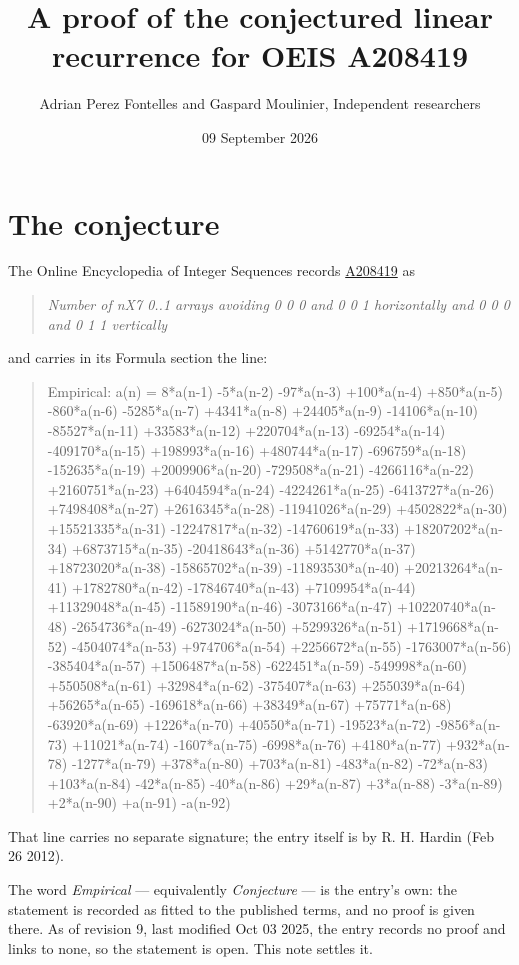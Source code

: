\documentclass[11pt]{article}
\title{A proof of the conjectured linear recurrence for OEIS A208419}
\author{Adrian Perez Fontelles and Gaspard Moulinier, Independent researchers}
\date{09 September 2026}
\theoremstyle{definition}
\begin{document}
\maketitle
\section{The conjecture}

The Online Encyclopedia of Integer Sequences records \href{https://oeis.org/A208419}{A208419} as

\begin{quote}\itshape Number of nX7 0..1 arrays avoiding 0 0 0 and 0 0 1 horizontally and 0 0 0 and 0 1 1 vertically\end{quote}

and carries in its Formula section the line:

\begin{quote}\ttfamily Empirical: a(n) = 8*a(n-1) -5*a(n-2) -97*a(n-3) +100*a(n-4) +850*a(n-5) -860*a(n-6) -5285*a(n-7) +4341*a(n-8) +24405*a(n-9) -14106*a(n-10) -85527*a(n-11) +33583*a(n-12) +220704*a(n-13) -69254*a(n-14) -409170*a(n-15) +198993*a(n-16) +480744*a(n-17) -696759*a(n-18) -152635*a(n-19) +2009906*a(n-20) -729508*a(n-21) -4266116*a(n-22) +2160751*a(n-23) +6404594*a(n-24) -4224261*a(n-25) -6413727*a(n-26) +7498408*a(n-27) +2616345*a(n-28) -11941026*a(n-29) +4502822*a(n-30) +15521335*a(n-31) -12247817*a(n-32) -14760619*a(n-33) +18207202*a(n-34) +6873715*a(n-35) -20418643*a(n-36) +5142770*a(n-37) +18723020*a(n-38) -15865702*a(n-39) -11893530*a(n-40) +20213264*a(n-41) +1782780*a(n-42) -17846740*a(n-43) +7109954*a(n-44) +11329048*a(n-45) -11589190*a(n-46) -3073166*a(n-47) +10220740*a(n-48) -2654736*a(n-49) -6273024*a(n-50) +5299326*a(n-51) +1719668*a(n-52) -4504074*a(n-53) +974706*a(n-54) +2256672*a(n-55) -1763007*a(n-56) -385404*a(n-57) +1506487*a(n-58) -622451*a(n-59) -549998*a(n-60) +550508*a(n-61) +32984*a(n-62) -375407*a(n-63) +255039*a(n-64) +56265*a(n-65) -169618*a(n-66) +38349*a(n-67) +75771*a(n-68) -63920*a(n-69) +1226*a(n-70) +40550*a(n-71) -19523*a(n-72) -9856*a(n-73) +11021*a(n-74) -1607*a(n-75) -6998*a(n-76) +4180*a(n-77) +932*a(n-78) -1277*a(n-79) +378*a(n-80) +703*a(n-81) -483*a(n-82) -72*a(n-83) +103*a(n-84) -42*a(n-85) -40*a(n-86) +29*a(n-87) +3*a(n-88) -3*a(n-89) +2*a(n-90) +a(n-91) -a(n-92)\end{quote}

That line carries no separate signature; the entry itself is by R. H. Hardin (Feb 26 2012).

The word {\itshape Empirical} --- equivalently {\itshape Conjecture} --- is the entry's own: the statement is recorded as fitted to the published terms, and no proof is given there. As of revision 9, last modified Oct 03 2025, the entry records no proof and links to none, so the statement is open. This note settles it.
\end{document}
